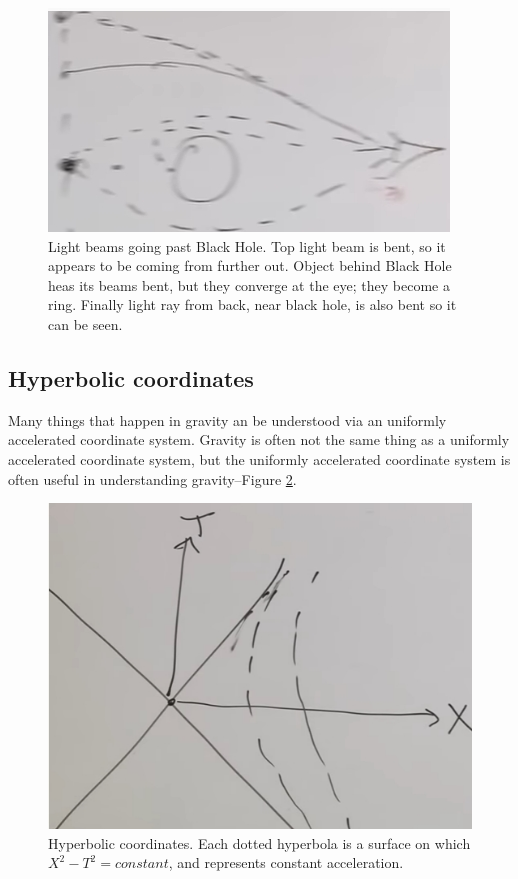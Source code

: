 \documentclass[]{article}
\begin{document}
{\begin{figure}[H]
	\caption[Light beams going past Black Hole]{Light beams going past Black Hole. Top light beam is bent, so it appears to be coming from further out. Object behind Black Hole heas its beams bent, but they converge at the eye; they become a ring. Finally light ray from back, near black hole, is also bent so it can be seen. }\label{fig:gr-6-light-rays-black-hole}
	\includegraphics{gr-6-light-rays-black-hole}
\end{figure}


\subsection{Hyperbolic coordinates}

Many things that happen in gravity an be understood via an uniformly accelerated coordinate system. Gravity is often not the same thing as a uniformly accelerated coordinate system, but the uniformly accelerated coordinate system is often useful in understanding gravity--Figure \ref{fig:gr-6-hyperbolic-coordinates}.

\begin{figure}[H]
	\caption[Hyperbolic coordinates. ]{Hyperbolic coordinates. Each dotted hyperbola is a surface on which $	X^2 - T^2 = constant$, and represents constant acceleration.}\label{fig:gr-6-hyperbolic-coordinates}
	\includegraphics{gr-6-hyperbolic-coordinates}
\end{figure}

}
\end{document}
